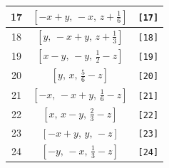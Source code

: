 \documentclass[fleqn,8pt]{jsarticle}
\begin{document}
\begin{longtable}{ccc}
17 & $\left[ - x + y,\, - x,\, z + \frac{1}{6} \right]$ & {\tt [17]} \\ \hline
18 & $\left[ y,\, - x + y,\, z + \frac{1}{3} \right]$ & {\tt [18]} \\ \hline
19 & $\left[ x - y,\, - y,\, \frac{1}{2} - z \right]$ & {\tt [19]} \\ \hline
20 & $\left[ y,\, x,\, \frac{5}{6} - z \right]$ & {\tt [20]} \\ \hline
21 & $\left[ - x,\, - x + y,\, \frac{1}{6} - z \right]$ & {\tt [21]} \\ \hline
22 & $\left[ x,\, x - y,\, \frac{2}{3} - z \right]$ & {\tt [22]} \\ \hline
23 & $\left[ - x + y,\, y,\, - z \right]$ & {\tt [23]} \\ \hline
24 & $\left[ - y,\, - x,\, \frac{1}{3} - z \right]$ & {\tt [24]} \\
\end{longtable}
\end{document}

